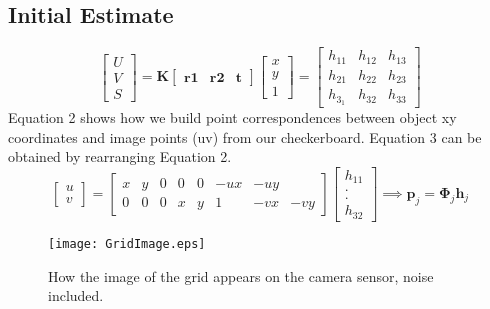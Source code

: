 \documentclass[titlepage]{article}
\begin{document}
\subsection{Initial Estimate}
\begin{equation}\label{uv-to-xy}
\begin{bmatrix}
  U\\ 
  V\\ 
  S 
  \end{bmatrix}
        = \textbf{K}
         \begin{bmatrix}
 \textbf{r1} & \textbf{r2} & \textbf{t}
         \end{bmatrix}
        \begin{bmatrix}
  x\\ 
  y\\ 
  1 
  \end{bmatrix}    
       =  \begin{bmatrix}
  h_{11}  & h_{12} & h_{13} \\ 
  h_{21}  & h_{22} & h_{23} \\ 
  h_{3_1}  & h_{32} & h_{33} 
  \end{bmatrix}
        \end{equation}
Equation 2 shows how we build point correspondences between object xy coordinates and image points (uv) from our checkerboard.  Equation 3 can be obtained by rearranging Equation 2.
%
\begin{equation}
    \label{Regressor}
  \begin{bmatrix}
  u\\ 
  v
  \end{bmatrix}
        = 
       \begin{bmatrix}
 x & y & 0 & 0 & 0 & -ux & -uy \\
 0 & 0 & 0 & x & y & 1 & -vx & -vy
  \end{bmatrix}
  \begin{bmatrix}
  h_{11}\\ 
    .\\
    .\\
  h_{32}
  \end{bmatrix}
 \implies \mathbf{p}_{j} = \mathbf{\Phi}_{j}  \mathbf{h}_{j}
      \end{equation}
\begin{wrapfigure}{R}{4.5}
  \begin{center}
    \label{wrap-fig:1}
    \texttt{[image: GridImage.eps]}
  \end{center}
  \caption{How the image of the grid appears on the camera sensor, noise included.}
\end{wrapfigure}
\end{document}
